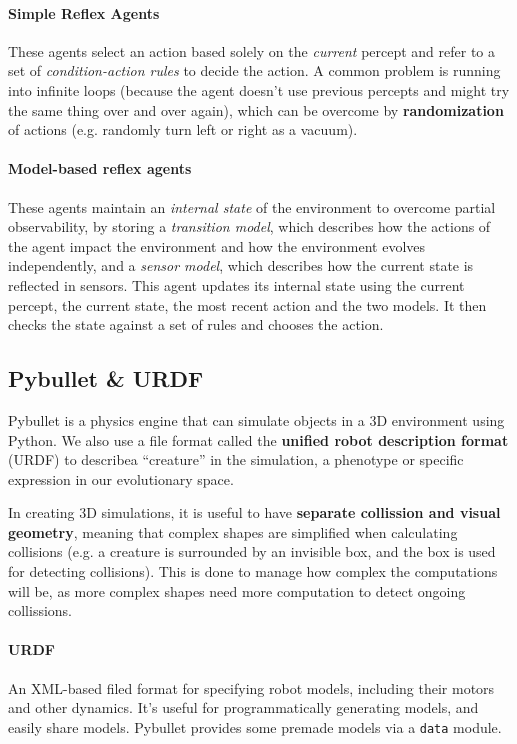 \paragraph{Simple Reflex Agents} These agents select an action based solely on the \textit{current} percept and refer to a set of \textit{condition-action rules} to decide the action. A common problem is running into infinite loops (because the agent doesn't use previous percepts and might try the same thing over and over again), which can be overcome by \textbf{randomization} of actions (e.g. randomly turn left or right as a vacuum).

\paragraph{Model-based reflex agents} These agents maintain an \textit{internal state} of the environment to overcome partial observability, by storing a \textit{transition model}, which describes how the actions of the agent impact the environment and how the environment evolves independently, and a \textit{sensor model}, which describes how the current state is reflected in sensors. This agent updates its internal state using the current percept, the current state, the most recent action and the two models. It then checks the state against a set of rules and chooses the action.


\subsection{Pybullet \& URDF}

Pybullet is a physics engine that can simulate objects in a 3D environment using Python. We also use a file format called the \textbf{unified robot description format} (URDF) to describea ``creature'' in the simulation, a phenotype or specific expression in our evolutionary space.

In creating 3D simulations, it is useful to have \textbf{separate collission and visual geometry}, meaning that complex shapes are simplified when calculating collisions (e.g. a creature is surrounded by an invisible box, and the box is used for detecting collisions). This is done to manage how complex the computations will be, as more complex shapes need more computation to detect ongoing collissions.

\paragraph{URDF} An XML-based filed format for specifying robot models, including their motors and other dynamics. It's useful for programmatically generating models, and easily share models. Pybullet provides some premade models via a \texttt{data} module.

